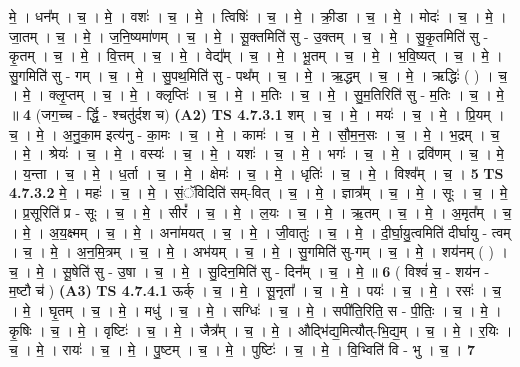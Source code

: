 \documentclass[17pt]{extarticle}
\begin{document}
                  मे॒ । धन᳚म् । च॒ । मे॒ । वशः॑ । च॒ । मे॒ । त्विषिः॑ । च॒ । मे॒ । क्री॒डा । च॒ । मे॒ । मोदः॑ । च॒ । मे॒ । जा॒तम् । च॒ । मे॒ । ज॒नि॒ष्यमा॑णम् । च॒ । मे॒ । सू॒क्तमिति॑ सु - उ॒क्तम् । च॒ । मे॒ । सु॒कृ॒तमिति॑ सु - कृ॒तम् । च॒ । मे॒ । वि॒त्तम् । च॒ । मे॒ । वेद्य᳚म् । च॒ । मे॒ । भू॒तम् । च॒ । मे॒ । भ॒वि॒ष्यत् । च॒ । मे॒ । सु॒गमिति॑ सु - गम् । च॒ । मे॒ । सु॒पथ॒मिति॑ सु - पथ᳚म् । च॒ । मे॒ । ऋ॒द्धम् । च॒ । मे॒ । ऋद्धिः॑ ( ) । च॒ । मे॒ । क्लृ॒प्तम् । च॒ । मे॒ । क्लृप्तिः॑ । च॒ । मे॒ । म॒तिः । च॒ । मे॒ । सु॒म॒तिरिति॑ सु - म॒तिः । च॒ । मे॒ ॥ \textbf{  4} \newline
                  \newline
                      (जग॒च्च - र्द्धि॒ - श्चतु॑र्दश च)  \textbf{(A2)} \newline \newline
                                \textbf{ TS 4.7.3.1} \newline
                  शम् । च॒ । मे॒ । मयः॑ । च॒ । मे॒ । प्रि॒यम् । च॒ । मे॒ । अ॒नु॒का॒म इत्य॑नु - का॒मः । च॒ । मे॒ । कामः॑ । च॒ । मे॒ । सौ॒म॒न॒सः । च॒ । मे॒ । भ॒द्रम् । च॒ । मे॒ । श्रेयः॑ । च॒ । मे॒ । वस्यः॑ । च॒ । मे॒ । यशः॑ । च॒ । मे॒ । भगः॑ । च॒ । मे॒ । द्रवि॑णम् । च॒ । मे॒ । य॒न्ता । च॒ । मे॒ । ध॒र्ता । च॒ । मे॒ । क्षेमः॑ । च॒ । मे॒ । धृतिः॑ । च॒ । मे॒ । विश्व᳚म् । च॒ । \textbf{  5} \newline
                  \newline
                                \textbf{ TS 4.7.3.2} \newline
                  मे॒ । महः॑ । च॒ । मे॒ । सं॒ॅविदिति॑ सम्-वित् । च॒ । मे॒ । ज्ञात्र᳚म् । च॒ । मे॒ । सूः । च॒ । मे॒ । प्र॒सूरिति॑ प्र - सूः । च॒ । मे॒ । सीरं᳚ । च॒ । मे॒ । ल॒यः । च॒ । मे॒ । ऋ॒तम् । च॒ । मे॒ । अ॒मृत᳚म् । च॒ । मे॒ । अ॒य॒क्ष्मम् । च॒ । मे॒ । अना॑मयत् । च॒ । मे॒ । जी॒वातुः॑ । च॒ । मे॒ । दी॒र्घा॒यु॒त्वमिति॑ दीर्घायु - त्वम् । च॒ । मे॒ । अ॒न॒मि॒त्रम् । च॒ । मे॒ । अभ॑यम् । च॒ । मे॒ । सु॒गमिति॑ सु-गम् । च॒ । मे॒ । शय॑नम् ( ) । च॒ । मे॒ । सू॒षेति॑ सु - उ॒षा । च॒ । मे॒ । सु॒दिन॒मिति॑ सु - दिन᳚म् । च॒ । मे॒ ॥ \textbf{  6 } \newline
                  \newline
                      ( विश्वं॑ च॒ - शय॑न - म॒ष्टौ च॑ )  \textbf{(A3)} \newline \newline
                                \textbf{ TS 4.7.4.1} \newline
                  ऊर्क् । च॒ । मे॒ । सू॒नृता᳚ । च॒ । मे॒ । पयः॑ । च॒ । मे॒ । रसः॑ । च॒ । मे॒ । घृ॒तम् । च॒ । मे॒ । मधु॑ । च॒ । मे॒ । सग्धिः॑ । च॒ । मे॒ । सपी॑ति॒रिति॒ स - पी॒तिः॒ । च॒ । मे॒ । कृ॒षिः । च॒ । मे॒ । वृष्टिः॑ । च॒ । मे॒ । जैत्र᳚म् । च॒ । मे॒ । औद्भि॑द्य॒मित्यौत्-भि॒द्य॒म् । च॒ । मे॒ । र॒यिः । च॒ । मे॒ । रायः॑ । च॒ । मे॒ । पु॒ष्टम् । च॒ । मे॒ । पुष्टिः॑ । च॒ । मे॒ । वि॒भ्विति॑ वि - भु । च॒ । \textbf{  7} \newline
\end{document}
